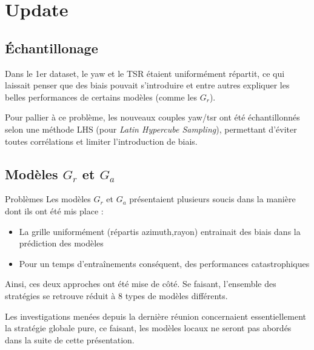 \documentclass[
11pt,notheorems,hyperref={pdfauthor=whatever}
]{beamer}
\begin{document}
\section{Update}

\subsection{Échantillonage}
\begin{frame}
    Dans le 1er dataset, le yaw et le TSR étaient uniformément répartit, ce qui laissait penser
    que des biais pouvait s'introduire et entre autres expliquer les belles performances de certains modèles (comme les $G_r$). 

    \vspace{0.3cm}

    Pour pallier à ce problème, les nouveaux couples yaw/tsr ont été échantillonnés selon une méthode LHS (pour \textit{Latin Hypercube Sampling}),
    permettant d'éviter toutes corrélations et limiter l'introduction de biais.
\end{frame}

\subsection{Modèles $G_r$ et $G_a$}

\begin{frame}{Problèmes}
    Les modèles $G_r$ et $G_a$ présentaient plusieurs soucis dans la manière dont ils ont été mis place :
    
    \begin{itemize}
        \item La grille uniformément (répartis azimuth,rayon) entrainait des biais dans la prédiction des modèles
        \item Pour un temps d'entraînements conséquent, des performances catastrophiques
    \end{itemize}

    Ainsi, ces deux approches ont été mise de côté. Se faisant, l'ensemble des stratégies se retrouve réduit à 8 types de modèles différents.   

    \vspace{0.2cm}

    Les investigations menées depuis la dernière réunion concernaient essentiellement la stratégie globale pure, ce faisant, les modèles
    locaux ne seront pas abordés dans la suite de cette présentation.

\end{frame}
\end{document}
